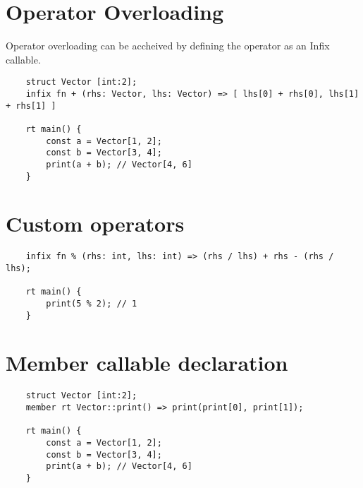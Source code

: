 \documentclass{report}
\begin{document}
\section{Operator Overloading}
Operator overloading can be accheived by defining the operator as an Infix callable.
\begin{verbatim}
    struct Vector [int:2];
    infix fn + (rhs: Vector, lhs: Vector) => [ lhs[0] + rhs[0], lhs[1] + rhs[1] ]

    rt main() {
        const a = Vector[1, 2];
        const b = Vector[3, 4];
        print(a + b); // Vector[4, 6]
    }
\end{verbatim}

\section {Custom operators}

\begin{verbatim}
    infix fn % (rhs: int, lhs: int) => (rhs / lhs) + rhs - (rhs / lhs);

    rt main() {
        print(5 % 2); // 1
    }
\end{verbatim}


\section{Member callable declaration}

\begin{verbatim}
    struct Vector [int:2];
    member rt Vector::print() => print(print[0], print[1]);

    rt main() {
        const a = Vector[1, 2];
        const b = Vector[3, 4];
        print(a + b); // Vector[4, 6]
    }
\end{verbatim}
\end{document}
